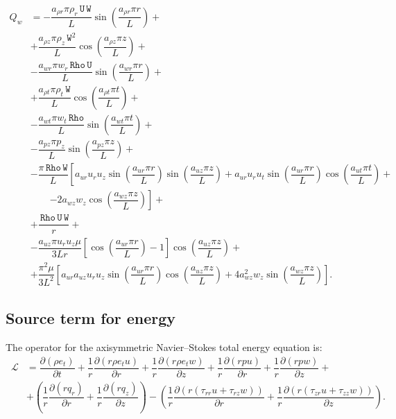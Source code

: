 \documentclass[10pt]{article}
\newcommand{\Diff}[2] {\dfrac{\partial( #1)}{\partial #2}}
\newcommand{\Lo}{\,\mathcal{L}}
\newcommand{\Rho}{\,\mathtt{Rho}}
\newcommand{\U}{\,\mathtt{U}}
\newcommand{\W}{\,\mathtt{W}}
\begin{document}
\begin{equation}
 \begin{split}
 \displaystyle
Q_w &= -\dfrac{a_{\rho r} \pi \rho_r \U \W }{L}\sin\left(\dfrac{a_{\rho r} \pi r}{L}\right)+ \\
&+\dfrac{a_{\rho z} \pi \rho_z \W^2 }{L}\cos\left(\dfrac{a_{\rho z} \pi z}{L}\right)+ \\
&-\dfrac{a_{wr} \pi w_r \Rho \U}{L}\sin\left(\dfrac{a_{wr} \pi r}{L}\right) + \\
&+\dfrac{a_{\rho t} \pi \rho_t \W }{L}\cos\left(\dfrac{a_{\rho t} \pi t}{L}\right)+ \\
&-\dfrac{a_{wt} \pi w_t \Rho}{L}\sin\left(\dfrac{a_{wt} \pi t}{L}\right) + \\
&-\dfrac{a_{pz} \pi p_z }{L}\sin\left(\dfrac{a_{pz} \pi z}{L}\right)+ \\
&-\dfrac{\pi \Rho \W}{L}\left[ a_{ur} u_r u_z \sin\left(\dfrac{a_{ur} \pi r}{L}\right) \sin\left(\dfrac{a_{uz} \pi z}{L}\right)+a_{ur} u_r u_t \sin\left(\dfrac{a_{ur} \pi r}{L}\right) \cos\left(\dfrac{a_{ut} \pi t}{L}\right)\right.+\\
&  \quad\quad\left.-2 a_{wz} w_z \cos\left(\dfrac{a_{wz} \pi z}{L}\right)\right] + \\
&+\dfrac{\Rho \U \W}{r}+\\
&-\dfrac{a_{uz} \pi u_r u_z \mu}{3L r} \left[\cos\left(\dfrac{a_{ur} \pi r}{L}\right)-1\right]  \cos\left(\dfrac{a_{uz} \pi z}{L}\right)+\\
&+\dfrac{ \pi^2 \mu}{3L^2} \left[ a_{ur} a_{uz} u_r u_z \sin\left(\dfrac{a_{ur} \pi r}{L}\right) \cos\left(\dfrac{a_{uz} \pi z}{L}\right)+4 a_{wz}^2 w_z \sin\left(\dfrac{a_{wz} \pi z}{L}\right)\right].
\end{split}
\end{equation}



\subsection{Source term for energy}

The operator for the axisymmetric Navier--Stokes total energy equation is:
\begin{equation*}
\begin{split}
 \Lo&= \Diff{\rho e_t}{ t}+\dfrac{1}{r}\Diff{r \rho e_t u}{ r}+\dfrac{1}{r}\Diff{r \rho e_t w}{z} +\dfrac{1}{r}\Diff{r p  u}{ r}+\dfrac{1}{r}\Diff{r p w}{z}+\\
&+\left(\dfrac{1}{r}\Diff{r q_r }{r} + \dfrac{1}{r}\Diff{r q_z }{z}\right) -\left(\dfrac{1}{r}\Diff{r( \tau_{rr} u + \tau_{rz} w ) }{r} + \dfrac{1}{r}\Diff{ r(\tau_{zr} u + \tau_{zz} w ) }{z}\right) .
\end{split}
\end{equation*}
\end{document}
